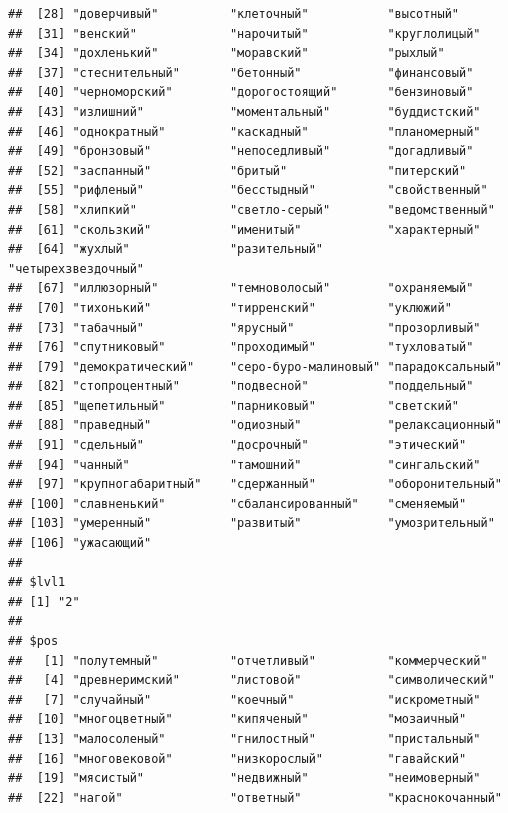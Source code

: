 \documentclass[11pt]{article}\usepackage[]{graphicx}\usepackage[]{color}
\makeatletter
\newenvironment{kframe}{%
 \def\at@end@of@kframe{}%
 \ifinner\ifhmode%
  \def\at@end@of@kframe{\end{minipage}}%
  \begin{minipage}{\columnwidth}%
 \fi\fi%
 \def\FrameCommand##1{\hskip\@totalleftmargin \hskip-\fboxsep
 \colorbox{shadecolor}{##1}\hskip-\fboxsep
     \hskip-\linewidth \hskip-\@totalleftmargin \hskip\columnwidth}%
 \MakeFramed {\advance\hsize-\width
   \@totalleftmargin\z@ \linewidth\hsize
   \@setminipage}}%
 {\par\unskip\endMakeFramed%
 \at@end@of@kframe}
\newenvironment{knitrout}{}{} %
\makeatother
\begin{document}
\begin{knitrout}
\begin{kframe}
\begin{verbatim}
##  [28] "доверчивый"          "клеточный"           "высотный"           
##  [31] "венский"             "нарочитый"           "круглолицый"        
##  [34] "дохленький"          "моравский"           "рыхлый"             
##  [37] "стеснительный"       "бетонный"            "финансовый"         
##  [40] "черноморский"        "дорогостоящий"       "бензиновый"         
##  [43] "излишний"            "моментальный"        "буддистский"        
##  [46] "однократный"         "каскадный"           "планомерный"        
##  [49] "бронзовый"           "непоседливый"        "догадливый"         
##  [52] "заспанный"           "бритый"              "питерский"          
##  [55] "рифленый"            "бесстыдный"          "свойственный"       
##  [58] "хлипкий"             "светло-серый"        "ведомственный"      
##  [61] "скользкий"           "именитый"            "характерный"        
##  [64] "жухлый"              "разительный"         "четырехзвездочный"  
##  [67] "иллюзорный"          "темноволосый"        "охраняемый"         
##  [70] "тихонький"           "тирренский"          "уклюжий"            
##  [73] "табачный"            "ярусный"             "прозорливый"        
##  [76] "спутниковый"         "проходимый"          "тухловатый"         
##  [79] "демократический"     "серо-буро-малиновый" "парадоксальный"     
##  [82] "стопроцентный"       "подвесной"           "поддельный"         
##  [85] "щепетильный"         "парниковый"          "светский"           
##  [88] "праведный"           "одиозный"            "релаксационный"     
##  [91] "сдельный"            "досрочный"           "этический"          
##  [94] "чанный"              "тамошний"            "сингальский"        
##  [97] "крупногабаритный"    "сдержанный"          "оборонительный"     
## [100] "славненький"         "сбалансированный"    "сменяемый"          
## [103] "умеренный"           "развитый"            "умозрительный"      
## [106] "ужасающий"          
## 
## $lvl1
## [1] "2"
## 
## $pos
##   [1] "полутемный"          "отчетливый"          "коммерческий"       
##   [4] "древнеримский"       "листовой"            "символический"      
##   [7] "случайный"           "коечный"             "искрометный"        
##  [10] "многоцветный"        "кипяченый"           "мозаичный"          
##  [13] "малосоленый"         "гнилостный"          "пристальный"        
##  [16] "многовековой"        "низкорослый"         "гавайский"          
##  [19] "мясистый"            "недвижный"           "неимоверный"        
##  [22] "нагой"               "ответный"            "краснокочанный"     

\end{verbatim}
\end{kframe}
\end{knitrout}
\end{document}
